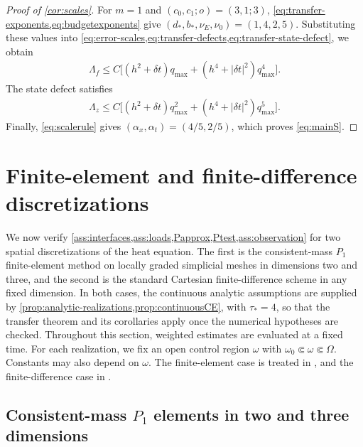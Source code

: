 \documentclass[print,wide,eng]{draft}
\begin{document}
%
\begin{proof}[Proof of \cref{cor:scales}]
For $m=1$ and $(c_0,c_1;o)=(3,1;3)$, \cref{eq:transfer-exponents,eq:budgetexponents} give
$(d_*,b_*,\nu_E,\nu_0)=(1,4,2,5)$.
Substituting these values into \cref{eq:error-scales,eq:transfer-defects,eq:transfer-state-defect}, we obtain\vspace{-1mm}
%
\begin{align*}
\Lambda_f\leq C\bigl[(h^2+{\delta t})q_{\max}+(h^4+{|\delta t|}^2)q_{\max}^4\bigr].
\end{align*}
%
The state defect satisfies\vspace{-3mm}
%
\begin{align*}
\Lambda_z \leq C\bigl[(h^2+{\delta t})q_{\max}^2+(h^4+{|\delta t|}^2)q_{\max}^5\bigr].
\end{align*}
%
Finally, \cref{eq:scalerule} gives $(\alpha_x,\alpha_t)=(4/5,2/5)$, which proves \cref{eq:mainS}.
\end{proof}
%



\section{Finite-element and finite-difference discretizations}\label{sec:realizations}

We now verify \cref{ass:interfaces,ass:loads,Papprox,Ptest,ass:observation} for two spatial discretizations of the heat equation. The first is the consistent-mass $P_1$ finite-element method on locally graded simplicial meshes in dimensions two and three, and the second is the standard Cartesian finite-difference scheme in any fixed dimension. In both cases, the continuous analytic assumptions are supplied by \cref{prop:analytic-realizations,prop:continuousCE}, with $\tau_*=4$, so that the transfer theorem and its corollaries apply once the numerical hypotheses are checked. Throughout this section, weighted estimates are evaluated at a fixed time. For each realization, we fix an open control region $\omega$ with $\omega_0\Subset\omega\Subset\Omega$. Constants may also depend on $\omega$. The finite-element case is treated in , and the finite-difference case in .


\subsection{Consistent-mass \texorpdfstring{$P_1$}{P1} elements in two and three dimensions}\label{sec:p1}
\end{document}
